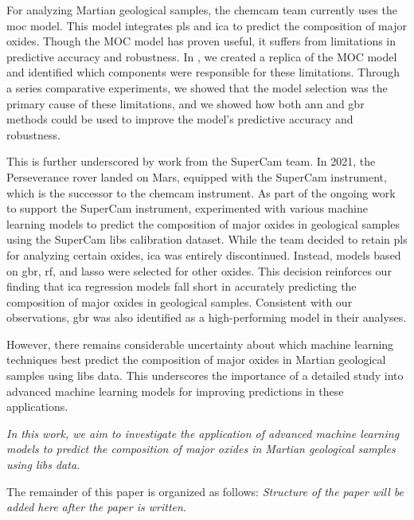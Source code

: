 For analyzing Martian geological samples, the \gls{chemcam} team currently uses the \gls{moc} model\cite{cleggRecalibrationMarsScience2017}.
This model integrates \gls{pls} and \gls{ica} to predict the composition of major oxides.
Though the MOC model has proven useful, it suffers from limitations in predictive accuracy and robustness.
In \citet{p9_paper}, we created a replica of the MOC model and identified which components were responsible for these limitations.
Through a series comparative experiments, we showed that the model selection was the primary cause of these limitations, and we showed how both \gls{ann} and \gls{gbr} methods could be used to improve the model's predictive accuracy and robustness.

This is further underscored by work from the SuperCam team.
In 2021, the Perseverance rover landed on Mars, equipped with the SuperCam instrument, which is the successor to the \gls{chemcam} instrument.
As part of the ongoing work to support the SuperCam instrument, \citet{andersonPostlandingMajorElement2022} experimented with various machine learning models to predict the composition of major oxides in geological samples using the SuperCam \gls{libs} calibration dataset.
While the team decided to retain \gls{pls} for analyzing certain oxides, \gls{ica} was entirely discontinued.
Instead, models based on \gls{gbr}, \gls{rf}, and \gls{lasso} were selected for other oxides.
This decision reinforces our finding that \gls{ica} regression models fall short in accurately predicting the composition of major oxides in geological samples.
Consistent with our observations, \gls{gbr} was also identified as a high-performing model in their analyses.

However, there remains considerable uncertainty about which machine learning techniques best predict the composition of major oxides in Martian geological samples using \gls{libs} data.
This underscores the importance of a detailed study into advanced machine learning models for improving predictions in these applications.

\textit{In this work, we aim to investigate the application of advanced machine learning models to predict the composition of major oxides in Martian geological samples using \gls{libs} data.}

The remainder of this paper is organized as follows:
\textit{Structure of the paper will be added here after the paper is written.}
